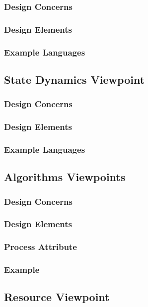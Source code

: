 \documentclass[letterpaper,10pt,titlepage,draftclsnofoot,onecolumn,onesided] {IEEEtran}
\begin{document}
\subsubsection{Design Concerns}
\subsubsection{Design Elements}
\subsubsection{Example Languages}

\subsection{State Dynamics Viewpoint}
\subsubsection{Design Concerns}
\subsubsection{Design Elements}
\subsubsection{Example Languages}

\subsection{Algorithms Viewpoints}
\subsubsection{Design Concerns}
\subsubsection{Design Elements}
\subsubsection{Process Attribute}
\subsubsection{Example}

\subsection{Resource Viewpoint}
\end{document}
